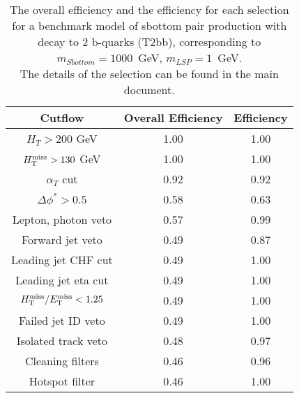 \begin{longtable}{| c | c | c  | }
\caption{The overall efficiency and the efficiency for each selection for a benchmark model 
  of sbottom pair production with decay to 2 b-quarks
  (T2bb), corresponding to $m_{Sbottom} = 1000 $~GeV, $m_{LSP} = 1$~GeV. \\
  The details of the selection can be found in the main document. \label{tab:T2bb_1000_1}} \\    \hline 
\textbf{Cutflow} & \textbf{Overall Efficiency} & \textbf{Efficiency}\\ \hline 
$H_{T} > 200$ GeV & 1.00 & 1.00\\ \hline 
$H_{\rm T}^{\rm miss} > 130$ GeV & 1.00 & 1.00\\ \hline 
$\alpha_{T}$ cut & 0.92 & 0.92\\ \hline 
$\Delta\phi^{*} > 0.5$ & 0.58 & 0.63\\ \hline 
Lepton, photon veto & 0.57 & 0.99\\ \hline 
Forward jet veto & 0.49 & 0.87\\ \hline 
Leading jet CHF cut & 0.49 & 1.00\\ \hline 
Leading jet eta cut & 0.49 & 1.00\\ \hline 
$H_{\rm T}^{\rm miss} / E_{\rm T}^{\rm miss} < 1.25$ & 0.49 & 1.00\\ \hline 
Failed jet ID veto & 0.49 & 1.00\\ \hline 
Isolated track veto & 0.48 & 0.97\\ \hline 
Cleaning filters & 0.46 & 0.96\\ \hline 
Hotspot filter & 0.46 & 1.00\\ \hline 
    \hline 
    \hline 
\end{longtable}
